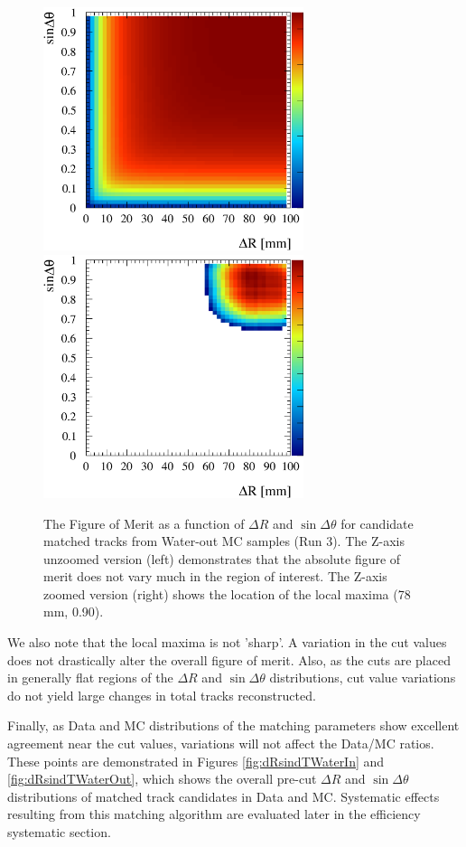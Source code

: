 \begin{figure}
\centering
\includegraphics[width=3in]{Figures/optCut-5E-Run3air-caseA-sinTdR-unzoomZ.eps}
\includegraphics[width=3in]{Figures/optCut-5E-Run3air-caseA-sinTdR-zoomZ.eps}
\caption{The Figure of Merit as a function of $\Delta R$ 
and $\sin\Delta\theta$ for candidate matched tracks from Water-out MC samples 
(Run 3). 
The Z-axis unzoomed version (left) demonstrates that 
the absolute figure of merit does not vary much in the region of interest. 
The Z-axis zoomed version (right) shows the location of 
the local maxima (78 mm, 0.90).} 
\label{fig:FOMRun3air}
\end{figure}

We also note that the local maxima is not 'sharp'. A variation in 
the cut values does not drastically alter the overall figure of merit. 
Also, as the cuts are placed in generally flat regions 
of the $\Delta R$ and $\sin\Delta\theta$ distributions, 
cut value variations do not yield large changes in total tracks reconstructed. 

Finally, as Data and MC distributions of the matching parameters 
show excellent agreement near the cut values, 
variations will not affect the Data/MC ratios. 
These points are demonstrated in Figures \ref{fig:dRsindTWaterIn} and 
\ref{fig:dRsindTWaterOut}, which shows the overall 
pre-cut $\Delta R$ and $\sin\Delta\theta$ distributions of matched track 
candidates in Data and MC. 
Systematic effects resulting from this matching algorithm 
are evaluated later in the efficiency systematic section.

